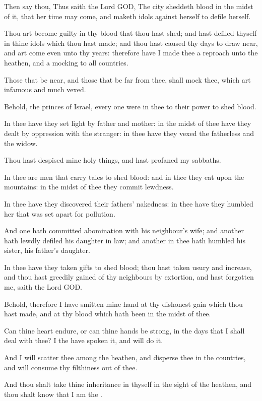 \Verse Then say thou, Thus saith the Lord GOD, The city sheddeth blood in the midst of it, that her time may come, and maketh idols against herself to defile herself.

\Verse Thou art become guilty in thy blood that thou hast shed; and hast defiled thyself in thine idols which thou hast made; and thou hast caused thy days to draw near, and art come even unto thy years: therefore have I made thee a reproach unto the heathen, and a mocking to all countries.

\Verse Those that be near, and those that be far from thee, shall mock thee, which art infamous and much vexed.

\Verse Behold, the princes of Israel, every one were in thee to their power to shed blood.

\Verse In thee have they set light by father and mother: in the midst of thee have they dealt by oppression with the stranger: in thee have they vexed the fatherless and the widow.

\Verse Thou hast despised mine holy things, and hast profaned my sabbaths.

\Verse In thee are men that carry tales to shed blood: and in thee they eat upon the mountains: in the midst of thee they commit lewdness.

\Verse In thee have they discovered their fathers' nakedness: in thee have they humbled her that was set apart for pollution.

\Verse And one hath committed abomination with his neighbour's wife; and another hath lewdly defiled his daughter in law; and another in thee hath humbled his sister, his father's daughter.

\Verse In thee have they taken gifts to shed blood; thou hast taken usury and increase, and thou hast greedily gained of thy neighbours by extortion, and hast forgotten me, saith the Lord GOD.

\Verse Behold, therefore I have smitten mine hand at thy dishonest gain which thou hast made, and at thy blood which hath been in the midst of thee.

\Verse Can thine heart endure, or can thine hands be strong, in the days that I shall deal with thee? I the \LORD have spoken it, and will do it.

\Verse And I will scatter thee among the heathen, and disperse thee in the countries, and will consume thy filthiness out of thee.

\Verse And thou shalt take thine inheritance in thyself in the sight of the heathen, and thou shalt know that I am the \LORD.

